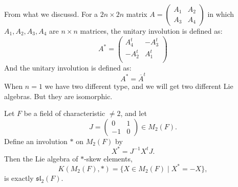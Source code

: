 \documentclass[11pt, a4paper]{report}
\begin{document}
\begin{example} 
From what we discussd. For a $2n \times 2n$ matrix $ A =\begin{pmatrix} A_1 & A_2 \\ A_3 & A_4 \end{pmatrix}$ in which $ A_1, A_2, A_3, A_4 $ are $ n \times n $ matrices, the unitary involution is defined as:
\[
A^*=
\begin{pmatrix}
    A_4^t & -A_3^t \\
    -A_2^t & A_1^t \\
\end{pmatrix}
\]
And the unitary involution is defined as:
\[
A^*=\overline{A}^t
\]
When $n=1$ we have two different type, and we will get two different Lie algebras. But they are isomorphic.
\end{example}

\begin{proposition}
    Let $F$ be a field of characteristic $\neq 2$, and let
    \[
    J=\begin{pmatrix}0&1\\-1&0\end{pmatrix}\in M_{2}(F).
    \]
    Define an involution $*$ on $M_{2}(F)$ by
    \[
    X^{*}=J^{-1}X^{t}J .
    \]
    Then the Lie algebra of $*$-skew elements,
    \[
    K(M_{2}(F),*)=\{X\in M_{2}(F)\mid X^{*}=-X\},
    \]
    is exactly $\mathfrak{sl}_{2}(F)$.
    \end{proposition}
    
\end{document}
